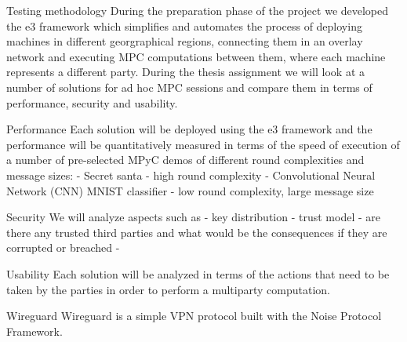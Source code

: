 \begin{frame}
\tableofcontents

\printnoidxglossary[type=\acronymtype,title=List of Abbreviations]
\listoffigures

\mainmatter
\end{frame}

\begin{frame}{Testing methodology}
\protect\hypertarget{testing-methodology}{}
During the preparation phase of the project we developed the \gls{e3}
framework which simplifies and automates the process of deploying
machines in different georgraphical regions, connecting them in an
overlay network and executing MPC computations between them, where each
machine represents a different party. During the thesis assignment we
will look at a number of solutions for ad hoc MPC sessions and compare
them in terms of performance, security and usability.

\begin{block}{Performance}
\protect\hypertarget{performance}{}
Each solution will be deployed using the \gls{e3} framework and the
performance will be quantitatively measured in terms of the speed of
execution of a number of pre-selected MPyC demos of different round
complexities and message sizes: - Secret santa - high round complexity -
Convolutional Neural Network (CNN) MNIST classifier - low round
complexity, large message size
\end{block}

\begin{block}{Security}
\protect\hypertarget{security}{}
We will analyze aspects such as - key distribution - trust model - are
there any trusted third parties and what would be the consequences if
they are corrupted or breached -
\end{block}

\begin{block}{Usability}
\protect\hypertarget{usability}{}
Each solution will be analyzed in terms of the actions that need to be
taken by the parties in order to perform a multiparty computation.
\end{block}
\end{frame}

\begin{frame}{Wireguard}
\protect\hypertarget{wireguard}{}
Wireguard is a simple VPN protocol built with the Noise Protocol
Framework.
\end{frame}
